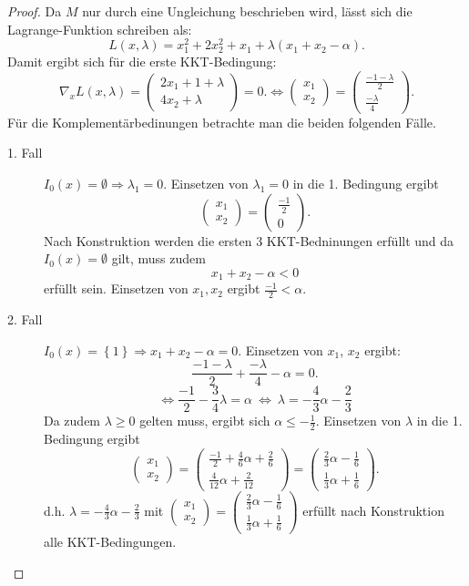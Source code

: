\documentclass[12pt]{extreport} %
\theoremstyle{named}
\theoremstyle{nnamed}
\theoremstyle{itshape}
\theoremstyle{normal}
\begin{document}
\begin{enumerate}
\begin{proof}
			Da $M$ nur durch eine Ungleichung beschrieben wird, lässt sich die Lagrange-Funktion schreiben als:
				$$L(x, \lambda) = x_1^2+2x_2^2+x_1+\lambda (x_1+x_2-\alpha). $$
			Damit ergibt sich für die erste KKT-Bedingung:
				$$ \nabla_x L(x, \lambda)=\begin{pmatrix} 2x_1+1+\lambda \\ 4x_2+ \lambda \end{pmatrix} =0. \Leftrightarrow  \begin{pmatrix}	x_1 \\ x_2\end{pmatrix} =  \begin{pmatrix} \frac{-1-\lambda}{2} \\ \frac{-\lambda}{4} \end{pmatrix}. $$
			Für die Komplementärbedinungen betrachte man die beiden folgenden Fälle. 
			\begin{description}
				\item[1. Fall] $ I_0(x)= \emptyset\Rightarrow \lambda_1=0$. Einsetzen von $\lambda_1=0$ in die 1. Bedingung ergibt 
					$$ \begin{pmatrix}	x_1 \\ x_2\end{pmatrix} =  \begin{pmatrix} \frac{-1}{2} \\ 0\end{pmatrix}. $$
				Nach Konstruktion werden die ersten 3 KKT-Bedninungen erfüllt und da $ I_0(x)= \emptyset $ gilt, muss zudem 
					$$x_1+x_2-\alpha < 0$$ 
					erfüllt sein. Einsetzen von $x_1, x_2$ ergibt $\frac{-1}{2} < \alpha$.
				\item[2. Fall] $ I_0(x)=\left\{1\right\} \Rightarrow x_1+x_2-\alpha= 0$. Einsetzen von $x_1$, $x_2$ ergibt: $$\frac{-1-\lambda}{2} + \frac{-\lambda}{4}-\alpha=0.$$
					$$ \iff \frac{-1}{2} -\frac{ 3}{4}\lambda=\alpha ~ \iff ~ \lambda= -\frac{4}{3}\alpha - \frac{2}{3} $$
					Da zudem $\lambda \geq 0$ gelten muss, ergibt sich $\alpha \leq - \frac{1}{2}$. Einsetzen von $\lambda$ in die 1. Bedingung ergibt 
			$$ \begin{pmatrix} x_1 \\ x_2\end{pmatrix} = \begin{pmatrix} \frac{-1}{2}+\frac{4}{6}\alpha+ \frac{2}{6} \\ \frac{4}{12}\alpha +\frac{2}{12}\end{pmatrix} = \begin{pmatrix} \frac{2}{3}\alpha- \frac{1}{6} \\ \frac{1}{3}\alpha +\frac{1}{6} \end{pmatrix}. $$
			d.h. $\lambda= -\frac{4}{3}\alpha - \frac{2}{3}$ mit $\begin{pmatrix} x_1 \\ x_2\end{pmatrix} = \begin{pmatrix} \frac{2}{3}\alpha- \frac{1}{6} \\ \frac{1}{3}\alpha +\frac{1}{6} \end{pmatrix}$ erfüllt nach Konstruktion alle KKT-Bedingungen. ~\\
			

\end{description}
\end{proof}
\end{enumerate}
\end{document}
